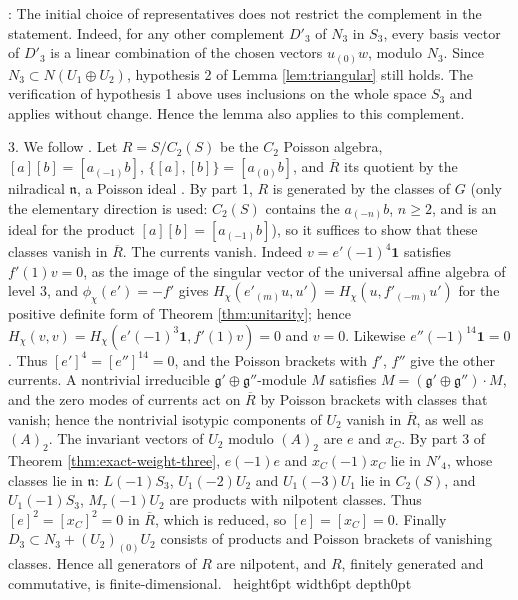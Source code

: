 \documentclass[leqno]{article}
\renewcommand{\geq}{\ensuremath{\geqslant}}
\newcommand{\qed}{\hfill \vrule height6pt  width6pt depth0pt}
\newenvironment{proof}[1][]{\noindent {\it Proof #1} : }{\hbox{~}\qed
\smallskip
}
\numberwithin{equation}{section}
\begin{document}
\begin{proof}
The initial choice of representatives does not restrict the complement in the statement. Indeed, for any other complement $D'_3$ of $N_3$ in $S_3$, every basis vector of $D'_3$ is a linear combination of the chosen vectors $u_{(0)}w$, modulo $N_3$. Since $N_3 \subset N(U_1 \oplus U_2)$, hypothesis 2 of Lemma \ref{lem:triangular} still holds. The verification of hypothesis 1 above uses inclusions on the whole space $S_3$ and applies without change. Hence the lemma also applies to this complement.

3. We follow \cite[Section 5]{Rie26b}. Let $R = S/C_2(S)$ be the $C_2$ Poisson algebra, $[a][b] = [a_{(-1)}b]$, $\{[a],[b]\} = [a_{(0)}b]$, and $\overline R$ its quotient by the nilradical $\mathfrak n$, a Poisson ideal \cite[Corollary 2.4.2]{Ara12}. By part 1, $R$ is generated by the classes of $G$ \cite[Corollary 2.6.2]{Ara12} (only the elementary direction is used: $C_2(S)$ contains the $a_{(-n)}b$, $n \geq 2$, and is an ideal for the product $[a][b] = [a_{(-1)}b]$), so it suffices to show that these classes vanish in $\overline R$. The currents vanish. Indeed $v = e'(-1)^4\mathbf 1$ satisfies $f'(1)v = 0$, as the image of the singular vector of the universal affine algebra of level $3$, and $\phi_\chi(e') = -f'$ gives $H_\chi(e'_{(m)}u,u') = H_\chi(u,f'_{(-m)}u')$ for the positive definite form of Theorem \ref{thm:unitarity}; hence $H_\chi(v,v) = H_\chi(e'(-1)^3\mathbf 1,f'(1)v) = 0$ and $v = 0$. Likewise $e''(-1)^{14}\mathbf 1 = 0$. Thus $[e']^4 = [e'']^{14} = 0$, and the Poisson brackets with $f'$, $f''$ give the other currents. A nontrivial irreducible $\mathfrak g' \oplus \mathfrak g''$-module $M$ satisfies $M = (\mathfrak g' \oplus \mathfrak g'')\cdot M$, and the zero modes of currents act on $\overline R$ by Poisson brackets with classes that vanish; hence the nontrivial isotypic components of $U_2$ vanish in $\overline R$, as well as $(A)_2$. The invariant vectors of $U_2$ modulo $(A)_2$ are $e$ and $x_C$. By part 3 of Theorem \ref{thm:exact-weight-three}, $e(-1)e$ and $x_C(-1)x_C$ lie in $N'_4$, whose classes lie in $\mathfrak n$: $L(-1)S_3$, $U_1(-2)U_2$ and $U_1(-3)U_1$ lie in $C_2(S)$, and $U_1(-1)S_3$, $M_\tau(-1)U_2$ are products with nilpotent classes. Thus $[e]^2 = [x_C]^2 = 0$ in $\overline R$, which is reduced, so $[e] = [x_C] = 0$. Finally $D_3 \subset N_3 + (U_2)_{(0)}U_2$ consists of products and Poisson brackets of vanishing classes. Hence all generators of $R$ are nilpotent, and $R$, finitely generated and commutative, is finite-dimensional.
\end{proof}
\end{document}
